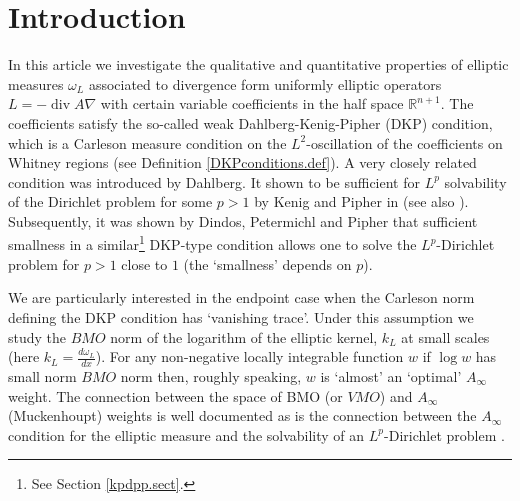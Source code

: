 \documentclass[11pt, a4paper,leqno]{amsart}
\theoremstyle{plain}
\theoremstyle{definition}
\theoremstyle{remark}
\numberwithin{equation}{section}
\newcommand{\hm}{\omega}
\def\div{\mathop{\operatorname{div}}\nolimits}
\begin{document}
\section{Introduction}
In this article we investigate the qualitative and quantitative properties of elliptic measures $\hm_L$ associated to divergence form uniformly elliptic operators $L = -\div A \nabla$ with certain variable coefficients in the half space $\mathbb{R}^{n+1}$. The coefficients satisfy the so-called weak Dahlberg-Kenig-Pipher (DKP) condition, which is a Carleson measure condition on the $L^2$-oscillation of the coefficients on Whitney regions (see Definition \ref{DKPconditions.def}). A very closely related condition was introduced by Dahlberg. 
It shown to be sufficient for $L^p$ solvability of the Dirichlet problem for some $p >1$ by Kenig and Pipher in \cite{KP} (see also \cite{HL}). Subsequently, it was shown by Dindos, Petermichl and Pipher \cite{DPP} that sufficient smallness in a similar\footnote{See Section \ref{kpdpp.sect}.} DKP-type condition allows one to solve the $L^p$-Dirichlet problem for $p >1$ close to $1$ (the `smallness' depends on $p$).

We are particularly interested in the endpoint case when the Carleson norm defining the DKP condition has `vanishing trace'. Under this assumption we study the $BMO$ norm of the logarithm of the elliptic kernel, $k_L$ at small scales (here $k_L = \tfrac{d\hm_L}{dx}$). For any non-negative locally integrable function $w$ if $\log w$ has small norm $BMO$ norm then, roughly speaking, $w$ is `almost' an `optimal' $A_\infty$ weight. The connection between the space of BMO (or $VMO$) and $A_\infty$ (Muckenhoupt) weights is well documented \cite{GCRDF, Sarason, Kor, Kor2} as is the connection between the $A_\infty$ condition for the elliptic measure and the solvability of an $L^p$-Dirichlet problem \cite{HofPLe}. 
\end{document}
